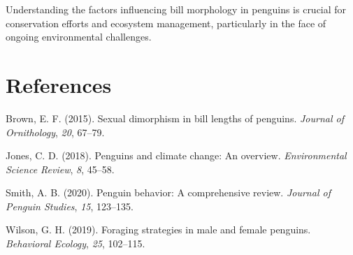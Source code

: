 \documentclass[
  man,
  longtable,
  nolmodern,
  notxfonts,
  notimes,
  colorlinks=true,linkcolor=blue,citecolor=blue,urlcolor=blue]{apa7}
\newlength{\cslhangindent}
\newenvironment{CSLReferences}[2] %
 {\begin{list}{}{%
  \setlength{\itemindent}{0pt}
  \setlength{\leftmargin}{0pt}
  \setlength{\parsep}{0pt}
  \ifodd #1
   \setlength{\leftmargin}{\cslhangindent}
   \setlength{\itemindent}{-1\cslhangindent}
  \fi
  \setlength{\itemsep}{#2\baselineskip}}}
 {\end{list}}
\begin{document}
Understanding the factors influencing bill morphology in penguins is
crucial for conservation efforts and ecosystem management, particularly
in the face of ongoing environmental challenges.

\section{References}\label{references}

\label{refs}
\begin{CSLReferences}{1}{0}
Brown, E. F. (2015). Sexual dimorphism in bill lengths of penguins.
\emph{Journal of Ornithology}, \emph{20}, 67--79.

Jones, C. D. (2018). Penguins and climate change: An overview.
\emph{Environmental Science Review}, \emph{8}, 45--58.

Smith, A. B. (2020). Penguin behavior: A comprehensive review.
\emph{Journal of Penguin Studies}, \emph{15}, 123--135.

Wilson, G. H. (2019). Foraging strategies in male and female penguins.
\emph{Behavioral Ecology}, \emph{25}, 102--115.

\end{CSLReferences}
\end{document}

